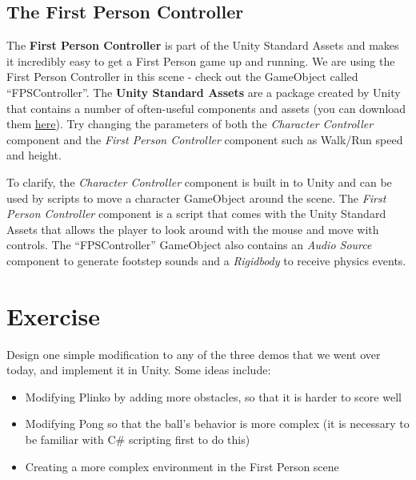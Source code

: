 \documentclass[11pt]{article}
\begin{document}
\subsection{The First Person Controller}

The \textbf{First Person Controller} is part of the Unity Standard Assets and makes it incredibly easy to get a First Person game up and running.  We are using the First Person Controller in this scene - check out the GameObject called ``FPSController''.  The \textbf{Unity Standard Assets} are a package created by Unity that contains a number of often-useful components and assets (you can download them \href{https://assetstore.unity.com/packages/essentials/asset-packs/standard-assets-32351}{here}).  Try changing the parameters of both the \textit{Character Controller} component and the \textit{First Person Controller} component such as Walk/Run speed and height.

To clarify, the \textit{Character Controller} component is built in to Unity and can be used by scripts to move a character GameObject around the scene.  The \textit{First Person Controller} component is a script that comes with the Unity Standard Assets that allows the player to look around with the mouse and move with  controls.  The ``FPSController'' GameObject also contains an \textit{Audio Source} component to generate footstep sounds and a \textit{Rigidbody} to receive physics events.

\section{Exercise}

Design one simple modification to any of the three demos that we went over today, and implement it in Unity.  Some ideas include:

\begin{itemize}
    \item Modifying Plinko by adding more obstacles, so that it is harder to score well
    \item Modifying Pong so that the ball's behavior is more complex (it is necessary to be familiar with C\# scripting first to do this)
    \item Creating a more complex environment in the First Person scene
\end{itemize}
\end{document}
